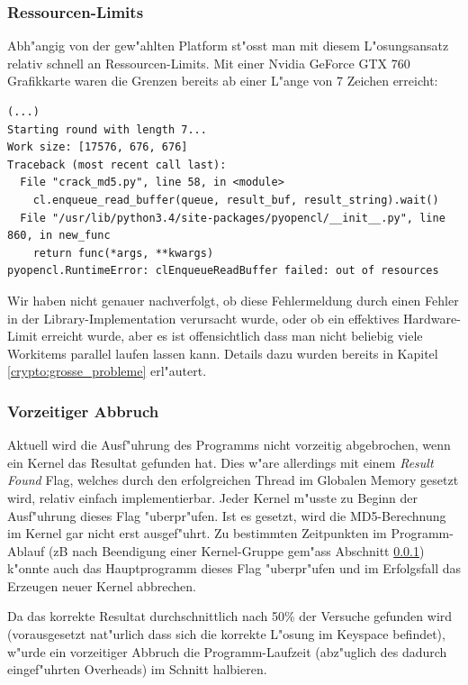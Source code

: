 \begin{refsection}
\subsubsection{Ressourcen-Limits}
\label{crypto:resourcenlimits}

Abh"angig von der gew"ahlten Platform st"osst man mit diesem L"osungsansatz
relativ schnell an Ressourcen-Limits. Mit einer Nvidia GeForce GTX 760
Grafikkarte waren die Grenzen bereits ab einer L"ange von 7 Zeichen erreicht:

\begin{small}
\begin{verbatim}
(...)
Starting round with length 7...
Work size: [17576, 676, 676]
Traceback (most recent call last):
  File "crack_md5.py", line 58, in <module>
    cl.enqueue_read_buffer(queue, result_buf, result_string).wait()
  File "/usr/lib/python3.4/site-packages/pyopencl/__init__.py", line 860, in new_func
    return func(*args, **kwargs)
pyopencl.RuntimeError: clEnqueueReadBuffer failed: out of resources
\end{verbatim}
\end{small}

Wir haben nicht genauer nachverfolgt, ob diese Fehlermeldung durch einen Fehler
in der Library-Implementation verursacht wurde, oder ob ein effektives
Hardware-Limit erreicht wurde, aber es ist offensichtlich dass man nicht
beliebig viele Workitems parallel laufen lassen kann. Details dazu wurden
bereits in Kapitel \ref{crypto:grosse_probleme} erl"autert.

\subsubsection{Vorzeitiger Abbruch}

Aktuell wird die Ausf"uhrung des Programms nicht vorzeitig abgebrochen, wenn ein
Kernel das Resultat gefunden hat. Dies w"are allerdings mit einem \textit{Result
Found} Flag, welches durch den erfolgreichen Thread im Globalen Memory gesetzt
wird, relativ einfach implementierbar. Jeder Kernel m"usste zu Beginn der
Ausf"uhrung dieses Flag "uberpr"ufen. Ist es gesetzt, wird die MD5-Berechnung im
Kernel gar nicht erst ausgef"uhrt. Zu bestimmten Zeitpunkten im Programm-Ablauf
(zB nach Beendigung einer Kernel-Gruppe gem"ass Abschnitt
\ref{crypto:resourcenlimits}) k"onnte auch das Hauptprogramm dieses Flag
"uberpr"ufen und im Erfolgsfall das Erzeugen neuer Kernel abbrechen.

Da das korrekte Resultat durchschnittlich nach 50\% der Versuche gefunden wird
(vorausgesetzt nat"urlich dass sich die korrekte L"osung im Keyspace befindet),
w"urde ein vorzeitiger Abbruch die Programm-Laufzeit (abz"uglich des dadurch
eingef"uhrten Overheads) im Schnitt halbieren.


\end{refsection}
